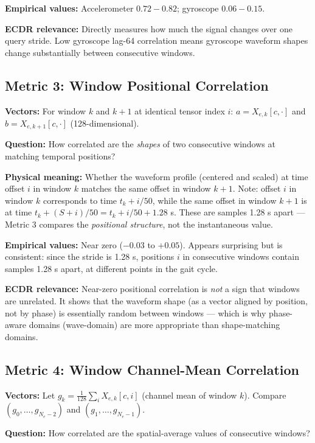 \documentclass[11pt, a4paper]{article}
\theoremstyle{definition}
\theoremstyle{plain}
\begin{document}
\textbf{Empirical values:} Accelerometer $0.72 - 0.82$; gyroscope $0.06 - 0.15$.

\textbf{ECDR relevance:} Directly measures how much the signal changes over one
query stride. Low gyroscope lag-64 correlation means gyroscope waveform shapes
change substantially between consecutive windows.

\subsection{Metric 3: Window Positional Correlation}

\textbf{Vectors:} For window $k$ and $k+1$ at identical tensor index $i$:
$a = X_{e,k}[c, \cdot]$ and $b = X_{e,k+1}[c, \cdot]$ (128-dimensional).

\textbf{Question:} How correlated are the \emph{shapes} of two consecutive windows
at matching temporal positions?

\textbf{Physical meaning:} Whether the waveform profile (centered and scaled) at
time offset $i$ in window $k$ matches the same offset in window $k+1$.
Note: offset $i$ in window $k$ corresponds to time $t_k + i/50$, while the same
offset in window $k+1$ is at time $t_k + (S + i)/50 = t_k + i/50 + 1.28$ s.
These are samples 1.28 s apart — Metric 3 compares the \emph{positional structure},
not the instantaneous value.

\textbf{Empirical values:} Near zero ($-0.03$ to $+0.05$). Appears surprising but is
consistent: since the stride is 1.28 s, positions $i$ in consecutive windows contain
samples 1.28 s apart, at different points in the gait cycle.

\textbf{ECDR relevance:} Near-zero positional correlation is \emph{not} a sign that
windows are unrelated. It shows that the waveform shape (as a vector aligned by
position, not by phase) is essentially random between windows — which is why
phase-aware domains (wave-domain) are more appropriate than shape-matching domains.

\subsection{Metric 4: Window Channel-Mean Correlation}

\textbf{Vectors:} Let $g_k = \frac{1}{128}\sum_i X_{e,k}[c, i]$ (channel mean
of window $k$). Compare $(g_0, \ldots, g_{N_e-2})$ and $(g_1, \ldots, g_{N_e-1})$.

\textbf{Question:} How correlated are the spatial-average values of consecutive windows?
\end{document}
